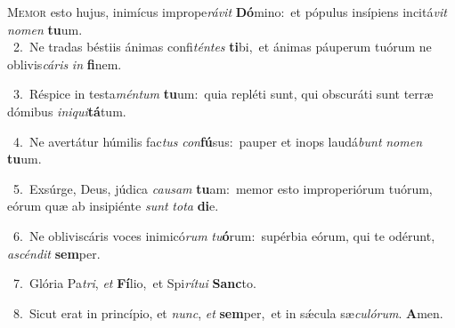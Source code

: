 \lettrine{\initial\textcolor{\initialcolor}{M}}{emor} esto hujus, inimícus imprope\-\textit{rá}\-\textit{vit} \textbf{Dó}\-mino:~\star et pópulus insípiens incitá\textit{vit} \textit{no}\-\textit{men} \textbf{tu}\-um.\\
{\numbfont\textcolor{\numbcolor}{~2.}}~Ne tradas béstiis ánimas confi\-\textit{tén}\-\textit{tes} \textbf{ti}\-bi,~\star et ánimas páuperum tuórum ne oblivis\-\textit{cá}\-\textit{ris} \textit{in} \textbf{fi}\-nem.\par
{\numbfont\textcolor{\numbcolor}{~3.}}~Réspice in testa\-\textit{mén}\-\textit{tum} \textbf{tu}\-um:~\star quia repléti sunt, qui obscuráti sunt terræ dómibus \textit{in}\-\textit{i}\textit{qui}\textbf{tá}tum.\par
{\numbfont\textcolor{\numbcolor}{~4.}}~Ne avertátur húmilis fac\textit{tus} \textit{con}\-\textbf{fú}sus:~\star pauper et inops laudá\textit{bunt} \textit{no}\-\textit{men} \textbf{tu}\-um.\par
{\numbfont\textcolor{\numbcolor}{~5.}}~Exsúrge, Deus, júdica \textit{cau}\-\textit{sam} \textbf{tu}\-am:~\star memor esto improperiórum tuórum, eórum quæ ab insipiénte \textit{sunt} \textit{to}\-\textit{ta} \textbf{di}\-e.\par
{\numbfont\textcolor{\numbcolor}{~6.}}~Ne obliviscáris voces inimicó\textit{rum} \textit{tu}\-\textbf{ó}rum:~\star supérbia eórum, qui te odérunt, \textit{a}\-\textit{scén}\textit{dit} \textbf{sem}\-per.\par
{\numbfont\textcolor{\numbcolor}{~7.}}~Glória Pa\-\textit{tri}\-, \textit{et} \textbf{Fí}\-lio,~\star et Spi\-\textit{rí}\-\textit{tu}\textit{i} \textbf{Sanc}\-to.\par
{\numbfont\textcolor{\numbcolor}{~8.}}~Sicut erat in princípio, et \textit{nunc}\-, \textit{et} \textbf{sem}\-per,~\star et in sǽcula sæ\-\textit{cu}\-\textit{ló}\textit{rum}. \textbf{A}\-men.\par
